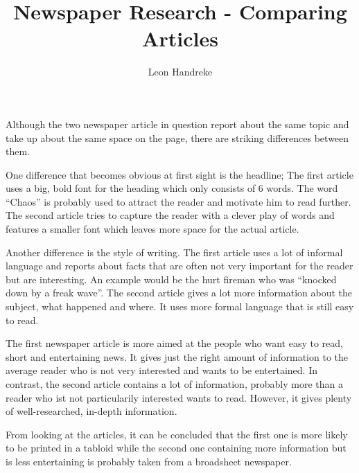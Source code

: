\documentclass[10pt]{article}
\title{Newspaper Research - Comparing Articles}
\author{Leon Handreke}
\date{}                                           %
\begin{document}
\doublespacing

\maketitle
{}\selectfont

Although the two newspaper article in question report about the same topic and take up about the same space on the page, there are striking differences between them.

One difference that becomes obvious at first sight is the headline; The first article uses a big, bold font for the heading which only consists of 6 words. The word ``Chaos'' is probably used to attract the reader and motivate him to read further. The second article tries to capture the reader with a clever play of words and features a smaller font which leaves more space for the actual article.

Another difference is the style of writing. The first article uses a lot of informal language and reports about facts that are often not very important for the reader but are interesting. An example would be the hurt fireman who was ``knocked down by a freak wave''. The second article gives a lot more information about the subject, what happened and where. It uses more formal language that is still easy to read.

The first newspaper article is more aimed at the people who want easy to read, short and entertaining news. It gives just the right amount of information to the average reader who is not very interested and wants to be entertained. In contrast, the second article contains a lot of information, probably more than a reader who ist not particularily interested wants to read. However, it gives plenty of well-researched, in-depth information.

From looking at the articles, it can be concluded that the first one is more likely to be printed in a tabloid while the second one containing more information but is less entertaining is probably taken from a broadsheet newspaper. 
\end{document}
